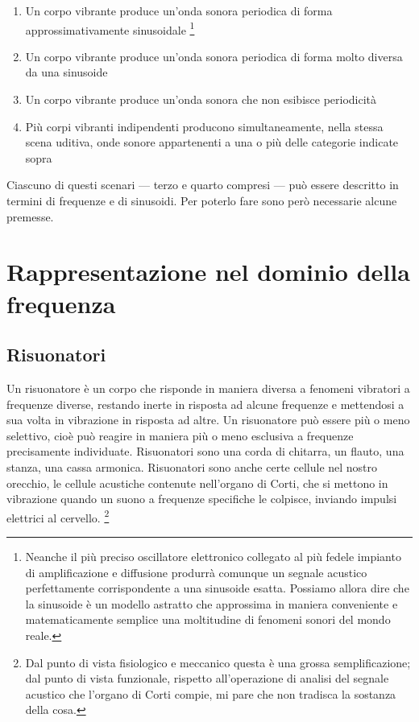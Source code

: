 \documentclass[11pt]{report}
\begin{document}
\begin{enumerate}

\item Un corpo vibrante produce un'onda sonora periodica di forma approssimativamente sinusoidale%
\footnote{Neanche il più preciso oscillatore elettronico collegato al più fedele impianto di amplificazione e diffusione produrrà comunque un segnale acustico perfettamente corrispondente a una sinusoide esatta. Possiamo allora dire che la sinusoide è un modello astratto che approssima in maniera conveniente e matematicamente semplice una moltitudine di fenomeni sonori del mondo reale.}

\item Un corpo vibrante produce un'onda sonora periodica di forma molto diversa da una sinusoide

\item Un corpo vibrante produce un'onda sonora che non esibisce periodicità

\item Più corpi vibranti indipendenti producono simultaneamente, nella stessa scena uditiva, onde sonore appartenenti a una o più delle categorie indicate sopra

\end{enumerate}

Ciascuno di questi scenari --- terzo e quarto compresi --- può essere descritto in termini di frequenze e di sinusoidi. Per poterlo fare sono però necessarie alcune premesse.




\section{Rappresentazione nel dominio della frequenza}

\subsection{Risuonatori} 

Un risuonatore è un corpo che risponde in maniera diversa a fenomeni vibratori a frequenze diverse, restando inerte in risposta ad alcune frequenze e mettendosi a sua volta in vibrazione in risposta ad altre. Un risuonatore può essere più o meno selettivo, cioè può reagire in maniera più o meno esclusiva a frequenze precisamente individuate. Risuonatori sono una corda di chitarra, un flauto, una stanza, una cassa armonica. Risuonatori sono anche certe cellule nel nostro orecchio, le cellule acustiche contenute nell'organo di Corti, che si mettono in vibrazione quando un suono a frequenze specifiche le colpisce, inviando impulsi elettrici al cervello.%
\footnote{Dal punto di vista fisiologico e meccanico questa è una grossa semplificazione; dal punto di vista funzionale, rispetto all'operazione di analisi del segnale acustico che l'organo di Corti compie, mi pare che non tradisca la sostanza della cosa.}
\end{document}

